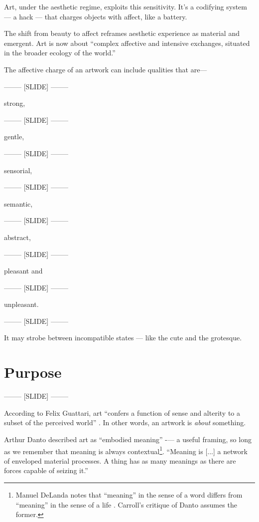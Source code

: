 \documentclass[letter:wpaper]{article}
\begin{document}
Art, under the aesthetic regime, exploits this sensitivity. It’s a codifying system — a hack — that charges objects with affect, like a battery.

The shift from beauty to affect reframes aesthetic experience as material and emergent. Art is now about “complex affective and intensive exchanges, situated in the broader ecology of the world.” \citep[p.155]{HighmoreBttrAftrTst2010}

The affective charge of an artwork can include qualities that are—

-------- [SLIDE] --------

strong,

-------- [SLIDE] --------

gentle,

-------- [SLIDE] --------

sensorial,

-------- [SLIDE] --------

semantic,

-------- [SLIDE] --------

abstract,

-------- [SLIDE] --------

pleasant and

-------- [SLIDE] --------

unpleasant.

-------- [SLIDE] --------

It may strobe between incompatible states — like the cute and the grotesque.

\section{Purpose}

    -------- [SLIDE] --------

    According to Felix Guattari, art ``confers a function of sense and alterity to a subset of the perceived world'' \citep[p.131]{GuattariChsmss1995}. In other words, an artwork is \emph{about} something.

    Arthur Danto described art as ``embodied meaning'' \citep[p.125]{DantoEmbdMnngs2007} -— a useful framing, so long as we remember that meaning is always contextual\footnote{
        Manuel DeLanda notes that “meaning” in the sense of a word differs from “meaning” in the sense of a life \citep[pp.40–41]{DeLandaCsltyAndMnng2018}. Carroll’s critique of Danto assumes the former.
    }. ``Meaning is [...] a network of enveloped material processes. A thing has as many meanings as there are forces capable of seizing it.'' \citep[p.10]{MassumiAUsrsGdTCptlsmAndSchzphrn1992}
\end{document}
